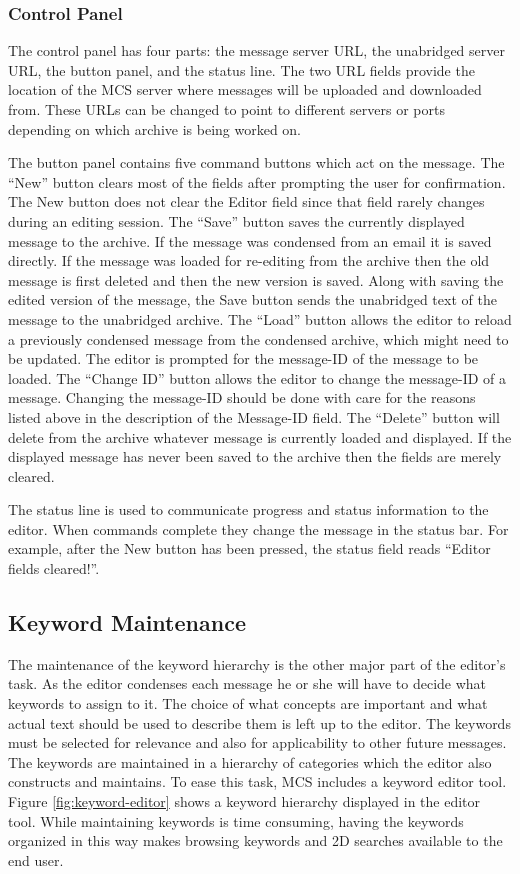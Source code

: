 \subsubsection{Control Panel}
The control panel has four parts: the message server URL, the unabridged server
URL, the button panel, and the status line. The two URL fields provide the
location of the MCS server where messages will be uploaded and downloaded from.
These URLs can be changed to point to different servers or ports depending on
which archive is being worked on.

The button panel contains five command buttons which act on the message. The
``New'' button clears most of the fields after prompting the user for
confirmation. The New button does not clear the Editor field since that field
rarely changes during an editing session. The ``Save'' button saves the
currently displayed message to the archive. If the message was condensed from
an email it is saved directly. If the message was loaded for re-editing from
the archive then the old message is first deleted and then the new version is
saved. Along with saving the edited version of the message, the Save button
sends the unabridged text of the message to the unabridged archive. The
``Load'' button allows the editor to reload a previously condensed message from
the condensed archive, which might need to be updated. The editor is prompted
for the message-ID of the message to be loaded. The ``Change ID'' button allows
the editor to change the message-ID of a message. Changing the message-ID
should be done with care for the reasons listed above in the description of the
Message-ID field. The ``Delete'' button will delete from the archive whatever
message is currently loaded and displayed. If the displayed message has never
been saved to the archive then the fields are merely cleared.

The status line is used to communicate progress and status information to the
editor. When commands complete they change the message in the status bar. For
example, after the New button has been pressed, the status field reads ``Editor
fields cleared!''.

\subsection{Keyword Maintenance}
\label{sec:keyword-maintenance}
The maintenance of the keyword hierarchy is the other major part of the
editor's task. As the editor condenses each message he or she will have to
decide what keywords to assign to it. The choice of what concepts are important
and what actual text should be used to describe them is left up to the editor.
The keywords must be selected for relevance and also for applicability to other
future messages. The keywords are maintained in a hierarchy of categories which
the editor also constructs and maintains. To ease this task, MCS includes a
keyword editor tool. Figure \ref{fig:keyword-editor} shows a keyword hierarchy
displayed in the editor tool. While maintaining keywords is time consuming,
having the keywords organized in this way makes browsing keywords and 2D
searches available to the end user.

